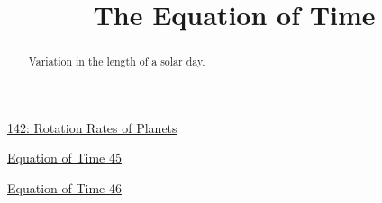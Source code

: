 \documentclass{ximera}
\title{The Equation of Time}
\begin{document}
\begin{abstract}
Variation in the length of a solar day.
\end{abstract}
\maketitle


\begin{onlineOnly}
    \begin{center}
\end{center}
\end{onlineOnly}

\href{https://www.desmos.com/calculator/golluueo9z}{142: Rotation Rates of Planets}



\begin{onlineOnly}
    \begin{center}
\end{center}
\end{onlineOnly}

\href{https://www.desmos.com/3d/mib6uatlx4}{Equation of Time 45}



\begin{onlineOnly}
    \begin{center}
\end{center}
\end{onlineOnly}

\href{https://www.desmos.com/3d/x0r5tktpr3}{Equation of Time 46}
\end{document}
